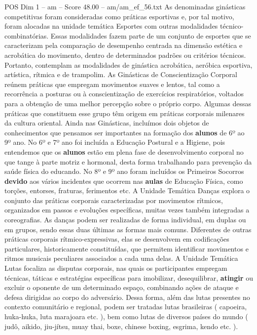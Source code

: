 \begin{textsample}{POS Dim 1 – am – Score 48.00 – am/am\_ef\_56.txt}
As denominadas ginásticas competitivas foram consideradas como práticas esportivas e, por tal motivo, foram alocadas na unidade temática Esportes com outras modalidades técnico-combinatórias.
Essas modalidades fazem parte de um conjunto de esportes que se caracterizam pela comparação de desempenho centrada na dimensão estética e acrobática do movimento, dentro de determinados padrões ou critérios técnicos.
Portanto, contemplam as modalidades de ginástica acrobática, aeróbica esportiva, artística, rítmica e de trampolim.
As Ginásticas de Conscientização Corporal reúnem práticas que empregam movimentos suaves e lentos, tal como a recorrência a posturas ou à conscientização de exercícios respiratórios, voltados para a obtenção de uma melhor percepção sobre o próprio corpo.
Algumas dessas práticas que constituem esse grupo têm origem em práticas corporais milenares da cultura oriental.
Ainda nas Ginásticas, incluímos dois objetos de conhecimentos que pensamos ser importantes na formação dos \textbf{alunos} de 6º ao 9º ano.
No 6º e 7º ano foi incluída a Educação Postural e a Higiene, pois entendemos que os \textbf{alunos} estão em plena fase de desenvolvimento corporal no que tange à parte motriz e hormonal, desta forma trabalhando para prevenção da saúde física do educando.
No 8º e 9º ano foram incluídos os Primeiros Socorros \textbf{devido} aos vários incidentes que ocorrem nas \textbf{aulas} de Educação Física, como torções, entorses, fraturas, ferimentos etc.
A Unidade Temática Danças explora o conjunto das práticas corporais caracterizadas por movimentos rítmicos, organizados em passos e evoluções específicas, muitas vezes também integradas a coreografias.
As danças podem ser realizadas de forma individual, em duplas ou em grupos, sendo essas duas últimas as formas mais comuns.
Diferentes de outras práticas corporais rítmico-expressivas, elas se desenvolvem em codificações particulares, historicamente constituídas, que permitem identificar movimentos e ritmos musicais peculiares associados a cada uma delas.
A Unidade Temática Lutas focaliza as disputas corporais, nas quais os participantes empregam técnicas, táticas e estratégias específicas para imobilizar, desequilibrar, \textbf{atingir} ou excluir o oponente de um determinado espaço, combinando ações de ataque e defesa dirigidas ao corpo do adversário.
Dessa forma, além das lutas presentes no contexto comunitário e regional, podem ser tratadas lutas brasileiras ( capoeira, huka-huka, luta marajoara etc. ), bem como lutas de diversos países do mundo ( judô, aikido, jiu-jítsu, muay thai, boxe, chinese boxing, esgrima, kendo etc. ).

\end{textsample}
